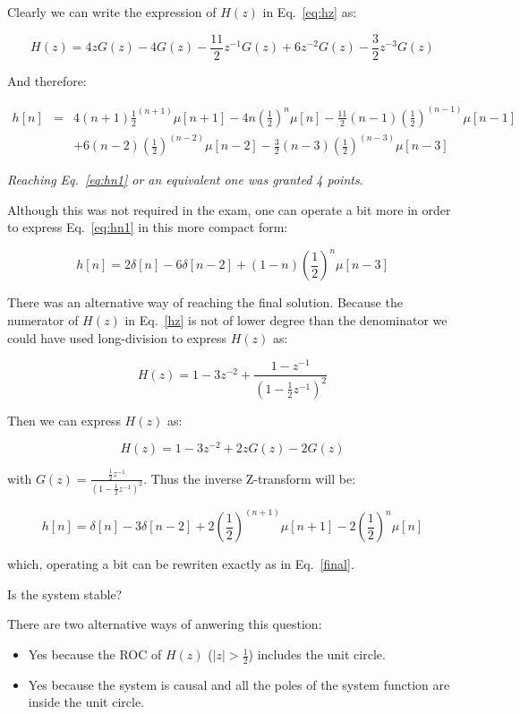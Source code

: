 \documentclass[a4paper,11pt,oneside]{article}
\begin{document}
Clearly we can write the expression of $H(z)$ in Eq.~\ref{eq:hz} as:


\[
H(z)=4zG(z)-4G(z)-\frac{11}{2}z^{-1}G(z)+6z^{-2}G(z)-\frac{3}{2}z^{-3}G(z)
\]

And therefore:

\begin{equation}\label{eq:hn1}
\begin{array}{lll}
h[n]&=&4(n+1)\frac{1}{2}^{(n+1)}\mu[n+1]-4n\left(\frac{1}{2}\right)^n\mu[n]-\frac{11}{2}(n-1)\left(\frac{1}{2}\right)^{(n-1)}\mu[n-1]\\
&&+6(n-2)\left(\frac{1}{2}\right)^{(n-2)}\mu[n-2]-\frac{3}{2}(n-3)\left(\frac{1}{2}\right)^{(n-3)}\mu[n-3]
\end{array}
\end{equation}

\emph{Reaching Eq.~\ref{eq:hn1} or an equivalent one was granted 4 points}.

Although this was not required in the exam, one can operate a bit more in order to express Eq.~\ref{eq:hn1} in this more compact form:

\begin{equation}\label{final}
h[n]=2\delta[n]-6\delta[n-2]+(1-n)\left(\frac{1}{2}\right)^n\mu[n-3]
\end{equation}

There was an alternative way of reaching the final solution. Because the numerator of $H(z)$ in Eq.~\ref{hz} is not of lower degree than the denominator we could have used long-division to express $H(z)$ as:

\begin{equation}\label{eq:zeros}
H(z)=1-3z^{-2} + \frac{1-z^{-1}}{\left(1-\frac{1}{2}z^{-1}\right)^2}
\end{equation}

Then we can express $H(z)$ as:

\[
H(z)=1-3z^{-2} + 2zG(z)-2G(z)
\]

with $G(z)=\frac{\frac{1}{2}z^{-1}}{(1-\frac{1}{2}z^{-1})^2}$. Thus the inverse Z-transform will be:

\begin{equation}
h[n]=\delta[n]-3\delta[n-2]+2\left(\frac{1}{2}\right)^{(n+1)}\mu[n+1]-2\left(\frac{1}{2}\right)^{n}\mu[n]
\end{equation}

which, operating a bit can be rewriten exactly as in Eq.~\ref{final}.

Is the system stable?

There are two alternative ways of anwering this question:
\begin{itemize}
\item Yes because the ROC of $H(z)$ ($|z|>\frac{1}{2}$) includes the unit circle.
\item Yes because the system is causal and all the poles of the system function are inside the unit circle.
\end{itemize}
\end{document}
